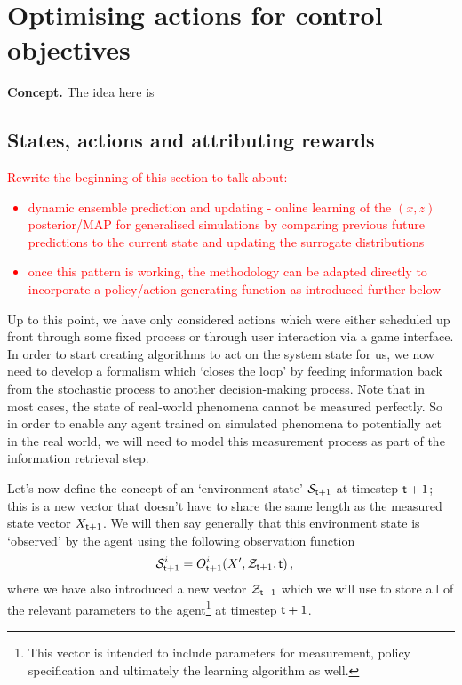 \chapter{\sffamily Optimising actions for control objectives}

{\bfseries\sffamily Concept.} The idea here is 

\section{\sffamily States, actions and attributing rewards}

\textcolor{red}{Rewrite the beginning of this section to talk about:
\begin{itemize}
\item{dynamic ensemble prediction and updating - online learning of the $(x,z)$ posterior/MAP for generalised simulations by comparing previous future predictions to the current state and updating the surrogate distributions}
\item{once this pattern is working, the methodology can be adapted directly to incorporate a policy/action-generating function as introduced further below}    
\end{itemize}
}

Up to this point, we have only considered actions which were either scheduled up front through some fixed process or through user interaction via a game interface. In order to start creating algorithms to act on the system state for us, we now need to develop a formalism which `closes the loop' by feeding information back from the stochastic process to another decision-making process. Note that in most cases, the state of real-world phenomena cannot be measured perfectly. So in order to enable any agent trained on simulated phenomena to potentially act in the real world, we will need to model this measurement process as part of the information retrieval step.

Let's now define the concept of an `environment state' ${\cal S}_{{\sf t}+1}$ at timestep ${\sf t}+1$; this is a new vector that doesn't have to share the same length as the measured state vector $X_{{\sf t}+1}$. We will then say generally that this environment state is `observed' by the agent using the following observation function
\begin{align}
{\cal S}_{{\sf t}+1}^i &= O_{{\sf t}+1}^i(X',{\cal Z}_{{\sf t}+1},{\sf t}) \label{eq:generalised-state-measurement} \,,
\end{align}
where we have also introduced a new vector ${\cal Z}_{{\sf t}+1}$ which we will use to store all of the relevant parameters to the agent\footnote{This vector is intended to include parameters for measurement, policy specification and ultimately the learning algorithm as well.} at timestep ${\sf t}+1$.


